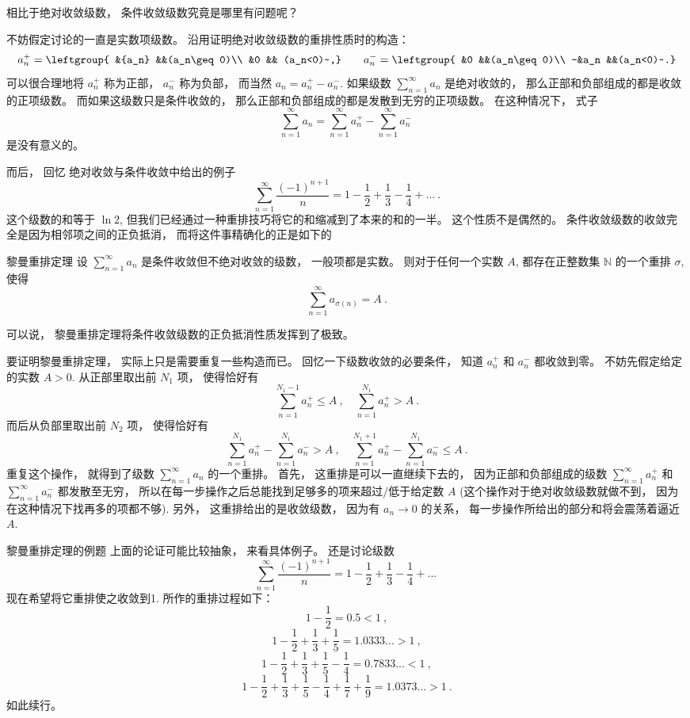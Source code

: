 

相比于绝对收敛级数， 条件收敛级数究竟是哪里有问题呢？ 

不妨假定讨论的一直是实数项级数。 沿用证明绝对收敛级数的重排性质时的构造： 
$$
a_n^+=\leftgroup{
&{a_n} &&(a_n\geq0)\\
&0 && (a_n<0)~,}
\qquad
a_n^-=\leftgroup{
&0 &&(a_n\geq0)\\
-&a_n &&(a_n<0)~.}
$$
可以很合理地将 $a_n^+$ 称为正部， $a_n^-$ 称为负部， 而当然 $a_n=a_n^+-a_n^-$. 如果级数 $\sum_{n=1}^\infty a_n$ 是绝对收敛的， 那么正部和负部组成的都是收敛的正项级数。 而如果这级数只是条件收敛的， 那么正部和负部组成的都是发散到无穷的正项级数。 在这种情况下， 式子
$$
\sum_{n=1}^\infty a_n=\sum_{n=1}^\infty a_n^+-\sum_{n=1}^\infty a_n^-~
$$
是没有意义的。

而后， 回忆 绝对收敛与条件收敛中给出的例子
$$
\sum_{n=1}^\infty\frac{(-1)^{n+1}}{n}
=1-\frac{1}{2}+\frac{1}{3}-\frac{1}{4}+...~.
$$
这个级数的和等于 $\ln2$, 但我们已经通过一种重排技巧将它的和缩减到了本来的和的一半。 这个性质不是偶然的。 条件收敛级数的收敛完全是因为相邻项之间的正负抵消， 而将这件事精确化的正是如下的

\begin{theorem}{黎曼重排定理}
设 $\sum_{n=1}^\infty a_n$ 是条件收敛但不绝对收敛的级数， 一般项都是实数。 则对于任何一个实数 $A$, 都存在正整数集 $\mathbb{N}$ 的一个重排 $\sigma$, 使得
$$
\sum_{n=1}^\infty a_{\sigma(n)}=A~.
$$
\end{theorem}

可以说， 黎曼重排定理将条件收敛级数的正负抵消性质发挥到了极致。

要证明黎曼重排定理， 实际上只是需要重复一些构造而已。 回忆一下级数收敛的必要条件， 知道 $a_n^+$ 和 $a_n^-$ 都收敛到零。 不妨先假定给定的实数 $A>0$. 从正部里取出前 $N_1$ 项， 使得恰好有
\[
\sum_{n=1}^{N_1-1}a_n^+\leq A~,
\quad
\sum_{n=1}^{N_1}a_n^+> A~.
\]
而后从负部里取出前 $N_2$ 项， 使得恰好有
\[
\sum_{n=1}^{N_1}a_n^+-\sum_{n=1}^{N_1}a_n^-> A~,
\quad
\sum_{n=1}^{N_1+1}a_n^+-\sum_{n=1}^{N_1}a_n^-\leq A~.
\]
重复这个操作， 就得到了级数 $\sum_{n=1}^\infty a_n$ 的一个重排。 首先， 这重排是可以一直继续下去的， 因为正部和负部组成的级数 $\sum_{n=1}^\infty a_n^+$ 和 $\sum_{n=1}^\infty a_n^-$ 都发散至无穷， 所以在每一步操作之后总能找到足够多的项来超过/低于给定数 $A$ (这个操作对于绝对收敛级数就做不到， 因为在这种情况下找再多的项都不够). 另外， 这重排给出的是收敛级数， 因为有 $a_n\to0$ 的关系， 每一步操作所给出的部分和将会震荡着逼近 $A$.

\begin{example}{黎曼重排定理的例题}
上面的论证可能比较抽象， 来看具体例子。 还是讨论级数
$$
\sum_{n=1}^\infty\frac{(-1)^{n+1}}{n}
=1-\frac{1}{2}+\frac{1}{3}-\frac{1}{4}+...~
$$
现在希望将它重排使之收敛到1. 所作的重排过程如下：
$$
1-\frac{1}{2}=0.5<1~,
$$ 
$$
1-\frac{1}{2}+\frac{1}{3}+\frac{1}{5}=1.0333...>1~,
$$ 
$$
1-\frac{1}{2}+\frac{1}{3}+\frac{1}{5}-\frac{1}{4}=0.7833...<1~,
$$ 
$$
1-\frac{1}{2}+\frac{1}{3}+\frac{1}{5}-\frac{1}{4}+\frac{1}{7}+\frac{1}{9}=1.0373...>1~.
$$
如此续行。
\end{example}